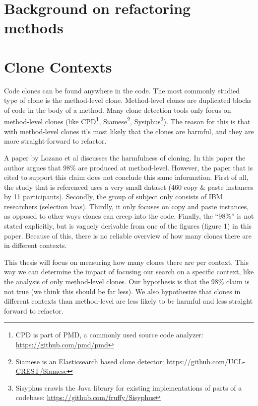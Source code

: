 \section{Background on refactoring methods}

\section{Clone Contexts} %
Code clones can be found anywhere in the code. The most commonly studied type of clone is the method-level clone. Method-level clones are duplicated blocks of code in the body of a method. Many clone detection tools only focus on method-level clones (like CPD\footnote{CPD is part of PMD, a commonly used source code analyzer: \url{https://github.com/pmd/pmd}}, Siamese\footnote{Siamese is an Elasticsearch based clone detector: \url{https://github.com/UCL-CREST/Siamese}}, Sysiphus\footnote{Sisyphus crawls the Java library for existing implementations of parts of a codebase: \url{https://github.com/fruffy/Sisyphus}}). The reason for this is that with method-level clones it's most likely that the clones are harmful, and they are more straight-forward to refactor.

A paper by Lozano et al \cite{lozano2007evaluating} discusses the harmfulness of cloning. In this paper the author argues that 98\% are produced at method-level. However, the paper that is cited to support this claim \cite{bergman2004ethnographic} does not conclude this same information. First of all, the study that is referenced uses a very small dataset (460 copy \& paste instances by 11 participants). Secondly, the group of subject only consists of IBM researchers (selection bias). Thirdly, it only focuses on copy and paste instances, as opposed to other ways clones can creep into the code. Finally, the ``98\%'' is not stated explicitly, but is vaguely derivable from one of the figures (figure 1) in this paper. Because of this, there is no reliable overview of how many clones there are in different contexts.

This thesis will focus on measuring how many clones there are per context. This way we can determine the impact of focusing our search on a specific context, like the analysis of only method-level clones. Our hypothesis is that the 98\% claim is not true (we think this should be far less). We also hypothesize that clones in different contexts than method-level are less likely to be harmful and less straight forward to refactor.

